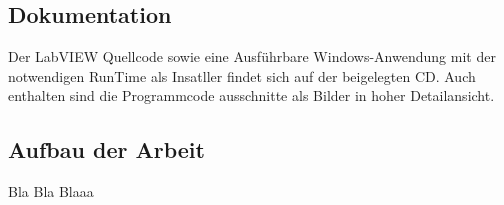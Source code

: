 
\subsection{Dokumentation}
Der LabVIEW Quellcode  sowie eine Ausführbare Windows-Anwendung mit der notwendigen RunTime als Insatller findet sich auf der beigelegten CD.
Auch enthalten sind die Programmcode ausschnitte als Bilder in hoher Detailansicht.


\subsection{Aufbau der Arbeit}

Bla Bla Blaaa




